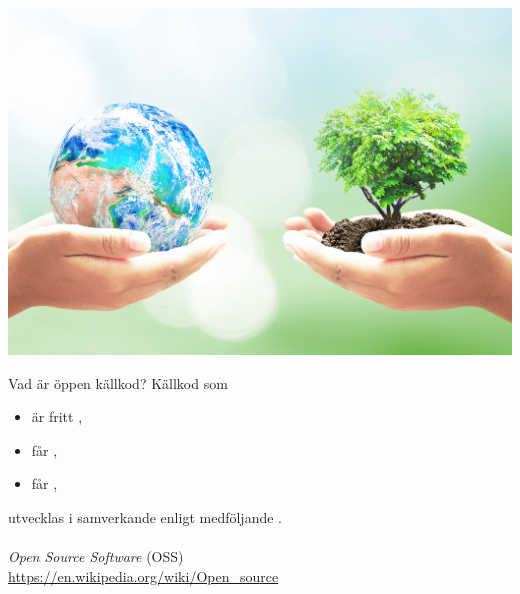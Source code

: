 \documentclass{simpleslides}
\begin{document}
{  
\begin{Slide}{}
  \vspace*{-1.0cm}\hspace*{-0.75cm}\includegraphics[width=1.2\textwidth]{img/earth-tree.jpg}

 {\fontsize{13}{13}\selectfont {}}
\end{Slide}
}

\begin{Slide}{Vad är öppen källkod?}
Källkod som 
  \begin{itemize}
    \item är fritt ,
    \item får ,
    \item får ,
  \end{itemize}
  utvecklas i samverkande  enligt medföljande . \\~\\
{\small \emph{Open Source Software} (OSS) \\ \href{https://en.wikipedia.org/wiki/Open_source}{https://en.wikipedia.org/wiki/Open\_source}}
\end{Slide}
\end{document}
